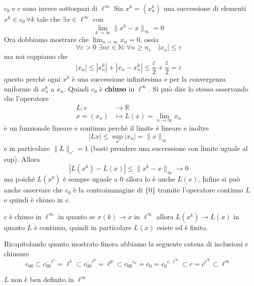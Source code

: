 \(c_{0}\) e \(c\) sono invece sottospazi di \(\ell^{\infty}\) 
Sia \(x^{k} = {(x^{k}_n)}\) una successione di elementi \(x^{k} \in c_{0} \,
\forall k\) tale che \(\exists x \in \ell^{\infty}\) con 
\[
    \lim_{k \to \infty} \|x^{k} - x\|_\infty = 0
\]
Ora dobbiamo mostrare che \(\lim_{n \to \infty} x_{n} = 0\), ossia
\[
    \forall \varepsilon > 0\, \,  \exists n\varepsilon \in \mathbb{N} : \forall
    n\ge n_\varepsilon \quad |x_{n}| \le \varepsilon
\]
ma noi sappiamo che
\[
    |x_n| \le |x_n^{k}| + |x_{n} - x_{n}^{k}| \le \frac{\varepsilon}{2} +
    \frac{\varepsilon}{2} = \varepsilon
\]
questo perché ogni \(x^{k}\) è una successione infinitesima e per la convergenza
uniforme di \(x_{n}^{k}\) a \(x_{n}\).
Quindi \(c_{0}\) è \textbf{chiuso} in \(\ell^{\infty}\). Si può dire lo stesso
osservando che l'operatore 
\begin{align}\label{eq:operatore_lim}
  L: c &\longrightarrow \mathbb{R} \\
  x = {(x_{n})} &\longmapsto L(x) = \lim_{n \to \infty} x_{n}
\end{align}
è un funzionale lineare e continuo perché il limite è lineare e inoltre
\[
  |Lx| \le \sup_{n} |x_{n}| = \|x\|_\infty 
\]
e in particolare \(\|L\|_{c'} = 1\) (basti prendere una successione con limite
uguale al sup). Allora
\[
  |L{(x^{k})} - L{(x)}| \le \|x^{k} - x\|_\infty \to 0
\]
ma poiché \(L{(x^{k})}\) è sempre uguale a \(0\) allora lo è anche \(L{(x)}\).
Infine si può anche osservare che \(c_{0}\) è la controimmagine di \(\{0\} \)
tramite l'operatore continuo \(L\) e quindi è chiuso in \(c\).

\(c\) è chiuso in \(\ell^{\infty}\) in quanto se \(x{(k)} \to x\) in
\(\ell^{\infty}\) allora \(L{(x^{k})} \to L{(x)}\) in quanto \(L\) è continuo,
quindi in particolare \(L{(x)}\) esiste ed è finito.

\begin{proposition} Ricapitolando quanto mostrato finora abbiamo la seguente
    catena di inclusioni e chiusure
    \[
      c_{00} \subset \overline{c_{00} }^{\ell^{1}}  =  \ell^{1} \subset
      \overline{c_{00} }^{\ell^{p}} = \ell^{p} \subset
      \overline{c_{00}}^{c_{0}} = c_{0} = \overline{c_{0}}^{c, \ell^{\infty}}
      \subset c = \overline{c}^{\ell^{\infty}} \subset \ell^{\infty} 
    \]
\end{proposition}

\begin{remark}
    \(L\) non è ben definito in \(\ell^{\infty}\) 
\end{remark}

